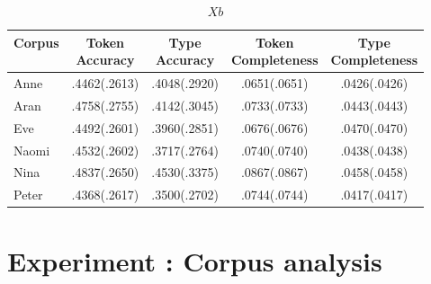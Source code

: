\begin{table}[ht]
  \footnotesize
  \centering
  \caption{$Xb$} \begin{tabular}{lcccc}
    \hline
    Corpus & \specialcell{Token\\Accuracy} & \specialcell{Type\\Accuracy} &
    \specialcell{Token\\Completeness} & \specialcell{Type\\Completeness}\\
    \hline
    Anne  & .4462(.2613) & .4048(.2920) & .0651(.0651) & .0426(.0426)\\ 
    Aran  & .4758(.2755) & .4142(.3045) & .0733(.0733) & .0443(.0443)\\
    Eve   & .4492(.2601) & .3960(.2851) & .0676(.0676) & .0470(.0470)\\
    Naomi & .4532(.2602) & .3717(.2764) & .0740(.0740) & .0438(.0438)\\
    Nina  & .4837(.2650) & .4530(.3375) & .0867(.0867) & .0458(.0458)\\
    Peter & .4368(.2617) & .3500(.2702) & .0744(.0744) & .0417(.0417)\\
    \hline
  \end{tabular}
  \label{t:mintz03Xb}
\end{table}
\section{Experiment : Corpus analysis}


